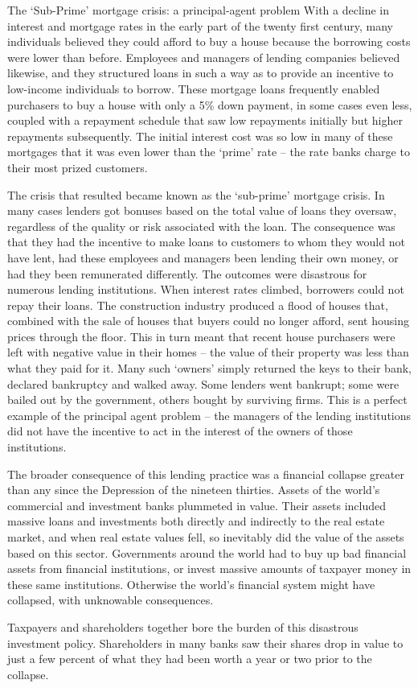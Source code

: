 \begin{ApplicationBox}{The `Sub-Prime' mortgage crisis: a principal-agent problem \label{app:subprime}}
With a decline in interest and mortgage rates in the early part of the twenty first century, many individuals believed they could afford to buy a house because the borrowing costs were lower than before. Employees and managers of lending companies believed likewise, and they structured loans in such a way as to provide an incentive to low-income individuals to borrow. These mortgage loans frequently enabled purchasers to buy a house with only a 5\% down payment, in some cases even less, coupled with a repayment schedule that saw low repayments initially but higher repayments subsequently. The initial interest cost was so low in many of these mortgages that it was even lower than the `prime' rate -- the rate banks charge to their most prized customers. 

\bigskip
The crisis that resulted became known as the `sub-prime' mortgage crisis. In many cases lenders got bonuses based on the total value of loans they oversaw, regardless of the quality or risk associated with the loan. The consequence was that they had the incentive to make loans to customers to whom they would not have lent, had these employees and managers been lending their own money, or had they been remunerated differently. The outcomes were disastrous for numerous lending institutions. When interest rates climbed, borrowers could not repay their loans. The construction industry produced a flood of houses that, combined with the sale of houses that buyers could no longer afford, sent housing prices through the floor. This in turn meant that recent house purchasers were left with negative value in their homes -- the value of their property was less than what they paid for it. Many such `owners' simply returned the keys to their bank, declared bankruptcy and walked away. Some lenders went bankrupt; some were bailed out by the government, others bought by surviving firms. This is a perfect example of the principal agent problem -- the managers of the lending institutions did not have the incentive to act in the interest of the owners of those institutions.

\bigskip
The broader consequence of this lending practice was a financial collapse greater than any since the Depression of the nineteen thirties. Assets of the world's commercial and investment banks plummeted in value. Their assets included massive loans and investments both directly and indirectly to the real estate market, and when real estate values fell, so inevitably did the value of the assets based on this sector. Governments around the world had to buy up bad financial assets from financial institutions, or invest massive amounts of taxpayer money in these same institutions. Otherwise the world's financial system might have collapsed, with unknowable consequences.

\bigskip
Taxpayers and shareholders together bore the burden of this disastrous investment policy. Shareholders in many banks saw their shares drop in value to just a few percent of what they had been worth a year or two prior to the collapse. 
\end{ApplicationBox}